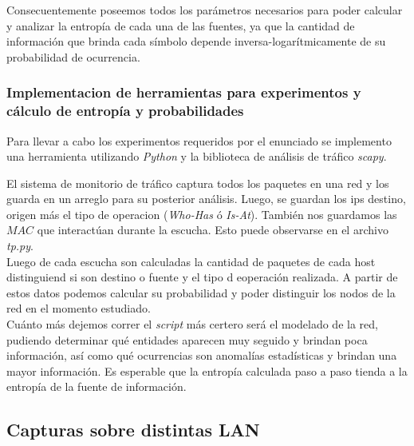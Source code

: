 Consecuentemente poseemos todos los parámetros necesarios para poder calcular y analizar la entropía de cada una de las fuentes,
ya que la cantidad de información que brinda cada símbolo depende inversa-logarítmicamente de su probabilidad de ocurrencia.\\

\subsubsection{Implementacion de herramientas para experimentos y cálculo de entropía y probabilidades}
Para llevar a cabo los experimentos requeridos por el enunciado se implemento una herramienta utilizando \emph{Python} y la biblioteca de 
análisis de tráfico \emph{scapy}.


El sistema de monitorio de tráfico captura todos los paquetes en una red y los guarda en un arreglo para su posterior análisis.
Luego, se guardan los ips destino, origen más el tipo de operacion (\emph{Who-Has} ó \emph{Is-At}). También nos guardamos las $MAC$ que interactúan
durante la escucha. Esto puede observarse en el archivo \emph{tp.py}.\\


Luego de cada escucha son calculadas la cantidad de paquetes de cada host distinguiend si son destino o fuente y el tipo d eoperación realizada.
A partir de estos datos podemos calcular su probabilidad y poder distinguir los nodos de la red en el momento estudiado.\\

Cuánto más dejemos correr el \emph{script} más certero será el modelado de la red, pudiendo determinar qué entidades aparecen 
muy seguido y brindan poca información, así como qué ocurrencias son anomalías estadísticas y brindan una mayor información. 
Es esperable que la entropía calculada paso a paso tienda a la entropía de la fuente de información.

\subsection{Capturas sobre distintas LAN}





